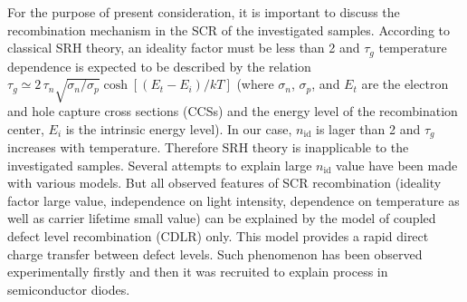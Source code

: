 \documentclass[aip,jap, amsmath,amssymb,reprint]{revtex4-1}
\begin{document}
For the purpose of present consideration, it is important to discuss the recombination mechanism in the SCR of the investigated samples.
According to classical SRH theory, an ideality factor must be less than 2 and
$\tau_g$ temperature dependence is expected \cite{TAUg:Schroder,TAUg:Aharoni} to be described by the relation  $\tau_g\simeq2\,\tau_n\sqrt{\sigma_n/\sigma_p}\cosh\left[\left(E_t-E_i\right)/kT\right]$
(where $\sigma_n$, $\sigma_p$, and  $E_t$ are the electron and hole capture cross sections (CCSs) and the energy  level of  the  recombination  center,
$E_i$  is the  intrinsic  energy level).
In our case, $n_{\mathrm{id}}$ is lager than 2 and $\tau_g$ increases with temperature.
Therefore SRH theory is inapplicable to the investigated samples.
Several attempts to explain large $n_{\mathrm{id}}$ value have been made with various models.\cite{Heide,Beier,Shah,Kaminski_n}
But all observed features of SCR recombination (ideality factor large value, independence on light intensity, dependence on temperature
as well as carrier lifetime small value) can be explained by the model of coupled defect level recombination (CDLR) \cite{CDLR:JAP1995,CDLR:JAP} only.
This model provides a rapid  direct  charge  transfer  between  defect levels.
Such phenomenon has been observed experimentally firstly \cite{DAPR:Chen1991,DAPR:Chen1994} and then it was recruited to explain process in semiconductor diodes. \cite{CDLR:JAP1995,CDLR:JAP,CDLR:SSP}
\end{document}
